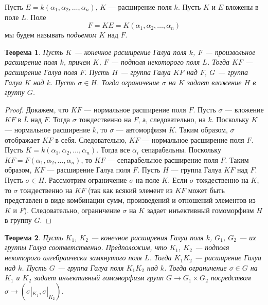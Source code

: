 \documentclass[12pt, titlepage, oneside]{amsbook}
\newtheorem{theorem}{Теорема}[chapter]
\theoremstyle{definition}
\theoremstyle{remark}
\begin{document}
Пусть $E=k(\alpha_1,\alpha_2,\ldots,\alpha_n)$, $K$ --- расширение поля $k$. Пусть $K$ и $E$ вложены в поле $L$. Поле $$F=KE=K(\alpha_1,\alpha_2,\ldots,\alpha_n)$$ мы будем называть \emph{подъемом} $K$ над $F$.

\begin{theorem}
\label{Komp1}
Пусть $K$ --- конечное расширение Галуа поля $k$, $F$ --- произвольное расширение поля $k$, причем $K$, $F$ --- подполя некоторого поля $L$. Тогда $KF$ --- расширение Галуа поля $F$. Пусть $H$ --- группа Галуа $KF$ над $F$, $G$ --- группа Галуа $K$ над $k$. Пусть $\sigma\in H$. Тогда ограничение $\sigma$ на $K$ задает вложение $H$ в группу $G$.
\end{theorem}

\begin{proof}
Докажем, что $KF$ --- нормальное расширение поля $F$. Пусть $\sigma$ --- вложение $KF$ в $\bar{L}$ над $F$. Тогда $\sigma$ тождественно на $F$, а, следовательно, на $k$. Поскольку $K$ --- нормальное расширение $k$, то $\sigma$ --- автоморфизм $K$. Таким образом, $\sigma$ отображает $KF$ в себя. Следовательно, $KF$ --- нормальное расширение поля $F$. Пусть $K=k(\alpha_1,\alpha_2,\ldots,\alpha_n)$. Тогда все $\alpha_i$ сепарабельны. Поскольку $KF=F(\alpha_1,\alpha_2,\ldots,\alpha_n)$, то $KF$ --- сепарабельное расширение поля $F$. Таким образом, $KF$ --- расширение Галуа поля $F$. Пусть $H$ --- группа Галуа $KF$ над $F$. Пусть $\sigma\in H$. Рассмотрим ограничение $\sigma$ на поле $K$. Если $\sigma$ тождественно на $K$, то $\sigma$ тождественно на $KF$ (так как всякий элемент из $KF$ может быть представлен в виде комбинации сумм, произведений и отношений элементов из $K$ и $F$). Следовательно, ограничение $\sigma$ на $K$ задает инъективный гомоморфизм $H$ в группу $G$.
\end{proof}

\begin{theorem}
\label{Komp2}
Пусть $K_1$, $K_2$ --- конечное расширения Галуа поля $k$, $G_1$, $G_2$ --- их группы Галуа соответственно. Предположим, что $K_1$, $K_2$ --- подполя некоторого алгебраически замкнутого поля $L$. Тогда $K_1K_2$ --- расширение Галуа над $k$. Пусть $G$ --- группа Галуа поля $K_1K_2$ над $k$. Тогда ограничение $\sigma\in G$ на $K_1$ и $K_2$ задает инъективный гомоморфизм групп $G\rightarrow G_1\times G_2$ посредством $\sigma\rightarrow(\sigma|_{K_1},\sigma|_{K_2})$.
\end{theorem}
\end{document}
